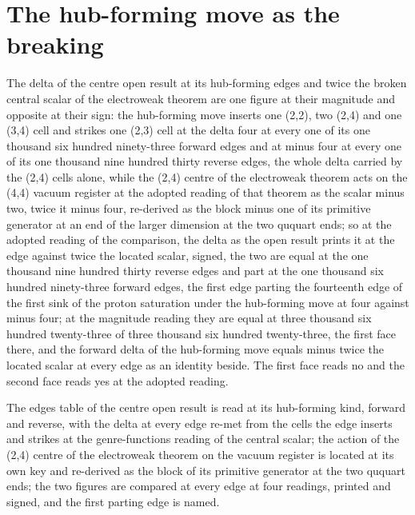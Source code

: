 \section{The hub-forming move as the breaking}\label{mod:I-4-D543848-w-hfbk}
\begin{chwall}\label{box:I-4-D543848-w-hfbk:1}
The delta of the centre open result at its hub-forming edges and twice the broken central scalar of the electroweak theorem are one figure at their magnitude and opposite at their sign: the hub-forming move inserts one (2,2), two (2,4) and one (3,4) cell and strikes one (2,3) cell at the delta four at every one of its one thousand six hundred ninety-three forward edges and at minus four at every one of its one thousand nine hundred thirty reverse edges, the whole delta carried by the (2,4) cells alone, while the (2,4) centre of the electroweak theorem acts on the (4,4) vacuum register at the adopted reading of that theorem as the scalar minus two, twice it minus four, re-derived as the block minus one of its primitive generator at an end of the larger dimension at the two ququart ends; so at the adopted reading of the comparison, the delta as the open result prints it at the edge against twice the located scalar, signed, the two are equal at the one thousand nine hundred thirty reverse edges and part at the one thousand six hundred ninety-three forward edges, the first edge parting the fourteenth edge of the first sink of the proton saturation under the hub-forming move at four against minus four; at the magnitude reading they are equal at three thousand six hundred twenty-three of three thousand six hundred twenty-three, the first face there, and the forward delta of the hub-forming move equals minus twice the located scalar at every edge as an identity beside. The first face reads no and the second face reads yes at the adopted reading.
\end{chwall}
The edges table of the centre open result is read at its hub-forming kind, forward and reverse, with the delta at every edge re-met from the cells the edge inserts and strikes at the genre-functions reading of the central scalar; the action of the (2,4) centre of the electroweak theorem on the vacuum register is located at its own key and re-derived as the block of its primitive generator at the two ququart ends; the two figures are compared at every edge at four readings, printed and signed, and the first parting edge is named.

